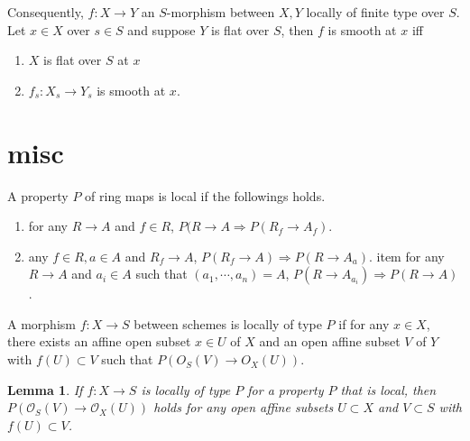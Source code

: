 \documentclass[leqno]{amsart}
\newcommand{\oo}{\mathcal O}
\newcommand{\1}{\mathbf{1}}
\newtheorem{lem}[thm]{Lemma}
\theoremstyle{definition}
\theoremstyle{remark}
\begin{document}
Consequently,
$f\colon X\to Y$ an  $S$-morphism
between  $X,Y$ locally of finite type over  $S$.
Let  $x\in X$ over  $s\in S$
and suppose  $Y$ is flat over  $S$,
then  $f$ is smooth at  $x$ iff
 \begin{enumerate}[label=(\alph*)]
	\item $X$ is flat over  $S$ at  $x$
	\item  $f_s\colon X_s\to Y_s$
		is smooth at  $x$.
\end{enumerate}

\section{misc}

A property $P$ of ring maps is local if 
the followings holds.
\begin{enumerate}[label=(\alph*)]
	 \item for  any $R\to A$ and  $f\in R$,
	 $P(R\to A \Longrightarrow P(R_f\to A_f)$.
	 \item    any  $f\in R, a\in A$ and  $R_f\to A$,
	 $P(R_f\to A)\Longrightarrow P(R\to A_a)$.
	 item for any  $R\to A$ and  $a_i\in A$ 
	 such that  $(a_1,\cdots,a_n)=A$,
		$P(R\to A_{a_i})\Longrightarrow P(R\to A)$.
\end{enumerate}
A morphism $f\colon X\to S$ between schemes 
is locally of type $P$ if for any  $x\in X$,
there exists an affine open subset  $x\in U$ of  $X$
and an open affine subset $V$ of $Y$ with  $f(U)\subset V$
such that $P(O_S(V)\to O_X(U))$.
\begin{lem}
	If $f\colon X\to S$ is locally of type  $P$
	for a property  $P$ that is local,
	then $P(\oo_S(V)\to \oo_X(U))$ holds
	for any open affine subsets 
	$U\subset X$ and  $V\subset S$
	with  $f(U)\subset V$.
\end{lem}



\end{document}

